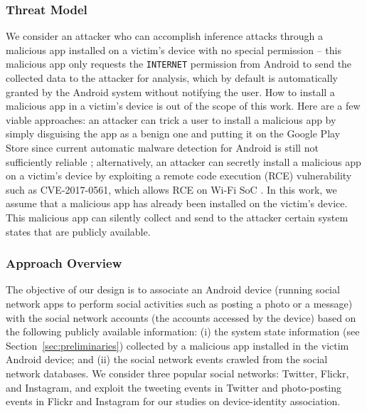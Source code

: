 \documentclass[letterpaper,12pt]{article}
\begin{document}
\subsubsection{Threat Model}\label{sec:dssnthreat}
We consider an attacker who can accomplish inference attacks through a malicious app installed on a victim's device with no special permission -- this malicious app only requests the \texttt{INTERNET} permission from Android to send the collected data to the attacker for analysis, which by default is automatically granted by the Android system without notifying the user. How to install a malicious app in a victim's device is out of the scope of this work. Here are a few viable approaches: an attacker can trick a user to install a malicious app by simply disguising the app as a benign one and putting it on the Google Play Store since current automatic malware detection for Android is still not sufficiently reliable \cite{googleplaymalware}; alternatively, an attacker can secretly install a malicious app on a victim's device by exploiting a remote code execution (RCE) vulnerability such as CVE-2017-0561, which allows RCE on Wi-Fi SoC \cite{wifirce}. In this work, we assume that a malicious app has already been installed on the victim's device. This malicious app can silently collect and send to the attacker certain system states that are publicly available.

\subsubsection{Approach Overview}\label{sec:dssnapproachoverview}
The objective of our design is to associate an Android device (running social network apps to perform social activities such as posting a photo or a message) with the social network accounts (the accounts accessed by the device) based on the following publicly available information: (i) the system state information (see Section~\ref{sec:preliminaries}) collected by a malicious app installed in the victim Android device; and (ii) the social network events crawled from the social network databases. We consider three popular social networks: Twitter, Flickr, and Instagram, and exploit the tweeting events in Twitter and photo-posting events in Flickr and Instagram for our studies on device-identity association. 
\end{document}

